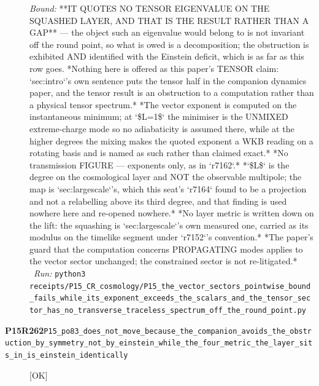 \begin{description}
 \emph{Bound:}  **IT QUOTES NO TENSOR EIGENVALUE ON THE SQUASHED LAYER, AND THAT IS THE RESULT RATHER THAN A GAP** --- the object such an eigenvalue would belong to is not invariant off the round point, so what is owed is a decomposition; the obstruction is exhibited AND identified with the Einstein deficit, which is as far as this row goes.  *Nothing here is offered as this paper's TENSOR claim: `sec:intro`'s own sentence puts the tensor half in the companion dynamics paper, and the tensor result is an obstruction to a computation rather than a physical tensor spectrum.*  *The vector exponent is computed on the instantaneous minimum; at `\$L=1\$` the minimiser is the UNMIXED extreme-charge mode so no adiabaticity is assumed there, while at the higher degrees the mixing makes the quoted exponent a WKB reading on a rotating basis and is named as such rather than claimed exact.*  *No transmission FIGURE --- exponents only, as in `r7162`.*  *`\$L\$` is the degree on the cosmological layer and NOT the observable multipole; the map is `sec:largescale`'s, which this seat's `r7164` found to be a projection and not a relabelling above its third degree, and that finding is used nowhere here and re-opened nowhere.*  *No layer metric is written down on the lift: the squashing is `sec:largescale`'s own measured one, carried as its modulus on the timelike segment under `r7152`'s convention.*  *The paper's guard that the computation concerns PROPAGATING modes applies to the vector sector unchanged; the constrained sector is not re-litigated.*
\ \emph{Run:} \texttt{python3 receipts/P15\_CR\_cosmology/P15\_the\_vector\_sectors\_pointwise\_bound\_fails\_while\_its\_exponent\_exceeds\_the\_scalars\_and\_the\_tensor\_sector\_has\_no\_transverse\_traceless\_spectrum\_off\_the\_round\_point.py}
\item[\rcptlabel{P15_po83_does_not_move_because_the_companion_avoids_the_obstruction_by_symmetry_not_by_einstein_while_the_four_metric_the_layer_sits_in_is_einstein_identically}{P15R262}\textbf{P15R262}\quad\texttt{P15\_po83\_does\_not\_move\_because\_the\_companion\_avoids\_the\_obstruction\_by\_symmetry\_not\_by\_einstein\_while\_the\_four\_metric\_the\_layer\_sits\_in\_is\_einstein\_identically}]\hfill\textsf{[OK]}\\

\end{description}
